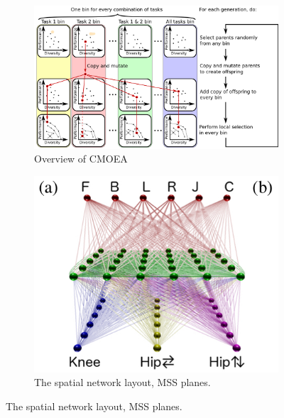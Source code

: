 \documentclass[format=acmsmall, review=false, screen=true]{acmart}
\begin{document}
\begin{figure}[H]
  \centering
  \begin{subfigure}[t]{0.55\textwidth}
    \includegraphics[width=\textwidth]{img/cmoea.JPEG}
    \caption{\label{fig:fronts}Overview of CMOEA}
  \end{subfigure}
  \hfill
  \begin{subfigure}[t]{0.43\textwidth}
    \includegraphics[width=\textwidth]{img/hyperneat.JPEG}
    \caption{\label{fig:endings}The spatial network layout, MSS planes.}
  \end{subfigure}
\end{figure}
\end{document}
